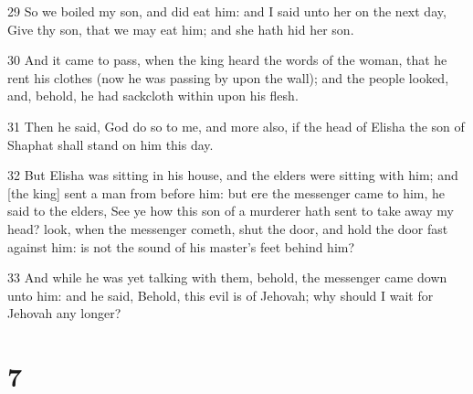\par 29 So we boiled my son, and did eat him: and I said unto her on the next day, Give thy son, that we may eat him; and she hath hid her son.
\par 30 And it came to pass, when the king heard the words of the woman, that he rent his clothes (now he was passing by upon the wall); and the people looked, and, behold, he had sackcloth within upon his flesh.
\par 31 Then he said, God do so to me, and more also, if the head of Elisha the son of Shaphat shall stand on him this day.
\par 32 But Elisha was sitting in his house, and the elders were sitting with him; and [the king] sent a man from before him: but ere the messenger came to him, he said to the elders, See ye how this son of a murderer hath sent to take away my head? look, when the messenger cometh, shut the door, and hold the door fast against him: is not the sound of his master's feet behind him?
\par 33 And while he was yet talking with them, behold, the messenger came down unto him: and he said, Behold, this evil is of Jehovah; why should I wait for Jehovah any longer?

\chapter{7}


